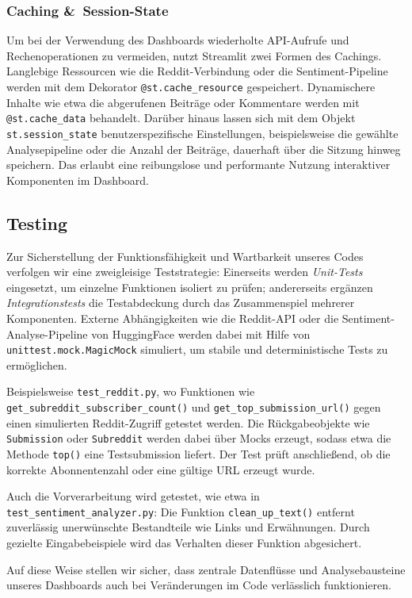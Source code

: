 \subsubsection{Caching \&~Session-State}
Um bei der Verwendung des Dashboards wiederholte API-Aufrufe und Rechenoperationen zu vermeiden, nutzt Streamlit zwei Formen des Cachings.
Langlebige Ressourcen wie die Reddit-Verbindung oder die Sentiment-Pipeline werden mit dem Dekorator \texttt{@st.cache\_resource} gespeichert.
Dynamischere Inhalte wie etwa die abgerufenen Beiträge oder Kommentare werden mit \texttt{@st.cache\_data} behandelt.
Darüber hinaus lassen sich mit dem Objekt \texttt{st.session\_state} benutzerspezifische Einstellungen, beispielsweise die gewählte Analysepipeline oder die Anzahl der Beiträge, dauerhaft über die Sitzung hinweg speichern.
Das erlaubt eine reibungslose und performante Nutzung interaktiver Komponenten im Dashboard.

\subsection{Testing}
Zur Sicherstellung der Funktionsfähigkeit und Wartbarkeit unseres Codes \newline
verfolgen wir eine zweigleisige Teststrategie: Einerseits werden \emph{Unit-Tests} eingesetzt, um einzelne Funktionen isoliert zu prüfen; andererseits ergänzen \emph{Integrationstests} die Testabdeckung durch das Zusammenspiel mehrerer Komponenten. Externe Abhängigkeiten wie die Reddit-API oder die Sentiment-Analyse-Pipeline von HuggingFace werden dabei mit Hilfe von \texttt{unittest.mock.MagicMock} simuliert, um stabile und deterministische Tests zu ermöglichen.

Beispielsweise \texttt{test\_reddit.py},\newline
wo Funktionen wie \texttt{get\_subreddit\_subscriber\_count()}\newline
und \texttt{get\_top\_submission\_url()} gegen einen simulierten Reddit-Zugriff getestet werden. Die Rückgabeobjekte wie \texttt{Submission} oder \texttt{Subreddit} werden dabei über Mocks erzeugt, sodass etwa die Methode \texttt{top()} eine Testsubmission liefert. Der Test prüft anschließend, ob die korrekte Abonnentenzahl oder eine gültige URL erzeugt wurde.

Auch die Vorverarbeitung wird getestet,\newline
wie etwa in \texttt{test\_sentiment\_analyzer.py}: Die Funktion \texttt{clean\_up\_text()} entfernt zuverlässig unerwünschte Bestandteile wie Links und Erwähnungen. Durch gezielte Eingabebeispiele wird das Verhalten dieser Funktion abgesichert.

Auf diese Weise stellen wir sicher, dass zentrale Datenflüsse und Analysebausteine unseres Dashboards auch bei Veränderungen im Code verlässlich funktionieren.
